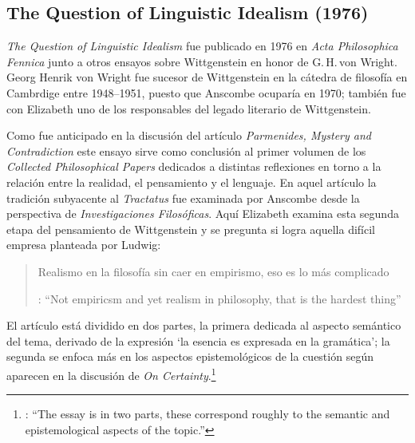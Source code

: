 \subsection{The Question of Linguistic Idealism (1976)}

\emph{The Question of Linguistic Idealism} fue publicado en 1976 en \emph{Acta Philosophica Fennica} junto a otros ensayos sobre Wittgenstein en honor de G.\,H.\,von Wright. Georg Henrik von Wright fue sucesor de Wittgenstein en la cátedra de filosofía en Cambrdige entre 1948--1951, puesto que Anscombe ocuparía en 1970; también fue con Elizabeth uno de los responsables del legado literario de Wittgenstein.

Como fue anticipado en la discusión del artículo \emph{Parmenides, Mystery and Contradiction} este ensayo sirve como conclusión al primer volumen de los \emph{Collected Philosophical Papers} dedicados a distintas reflexiones en torno a la relación entre la realidad, el pensamiento y el lenguaje. En aquel artículo la tradición subyacente al \emph{Tractatus} fue examinada por Anscombe desde la perspectiva de \emph{Investigaciones Filosóficas}. Aquí Elizabeth examina esta segunda etapa del pensamiento de Wittgenstein y se pregunta si logra aquella difícil empresa planteada por Ludwig: \blockquote[{\cite[112]{wittgenstein1956remmath}}: \enquote{Not empiricsm and yet realism in philosophy, that is the hardest thing}]{Realismo en la filosofía sin caer en empirismo, eso es lo más complicado}. El artículo está dividido en dos partes, la primera dedicada al aspecto semántico del tema, derivado de la expresión \enquote*{la esencia es expresada en la gramática}; la segunda se enfoca más en los aspectos epistemológicos de la cuestión según aparecen en la discusión de \emph{On Certainty}.\footnote{\cite[Cf.~][215]{teichmann2008ans}: \enquote{The essay is in two parts, these correspond roughly to the semantic and epistemological aspects of the topic.}}

